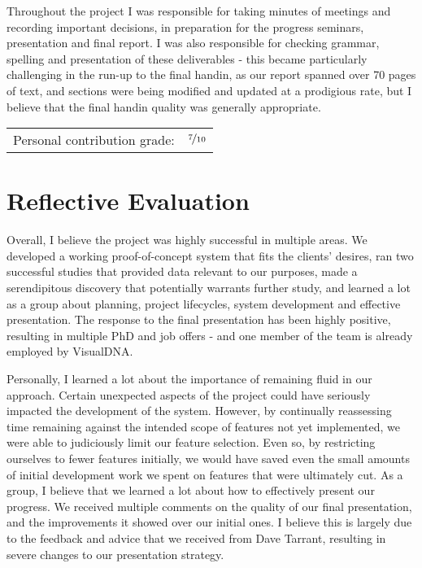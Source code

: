 Throughout the project I was responsible for taking minutes of meetings and recording important decisions, in preparation for the progress seminars, presentation and final report. I was also responsible for checking grammar, spelling and presentation of these deliverables - this became particularly challenging in the run-up to the final handin, as our report spanned over 70 pages of text, and sections were being modified and updated at a prodigious rate, but I believe that the final handin quality was generally appropriate.




\hfill \begin{tabular}{l l}
	Personal contribution grade: & $\nicefrac{7}{10}$ \\
\end{tabular}

\newpage
\section*{Reflective Evaluation}

Overall, I believe the project was highly successful in multiple areas. We developed a working proof-of-concept system that fits the clients' desires, ran two successful studies that provided data relevant to our purposes, made a serendipitous discovery that potentially warrants further study, and learned a lot as a group about planning, project lifecycles, system development and effective presentation. The response to the final presentation has been highly positive, resulting in multiple PhD and job offers - and one member of the team is already employed by VisualDNA.

Personally, I learned a lot about the importance of remaining fluid in our approach. Certain unexpected aspects of the project could have seriously impacted the development of the system. However, by continually reassessing time remaining against the intended scope of features not yet implemented, we were able to judiciously limit our feature selection. Even so, by restricting ourselves to fewer features initially, we would have saved even the small amounts of initial development work we spent on features that were ultimately cut. As a group, I believe that we learned a lot about how to effectively present our progress. We received multiple comments on the quality of our final presentation, and the improvements it showed over our initial ones. I believe this is largely due to the feedback and advice that we received from Dave Tarrant, resulting in severe changes to our presentation strategy.

